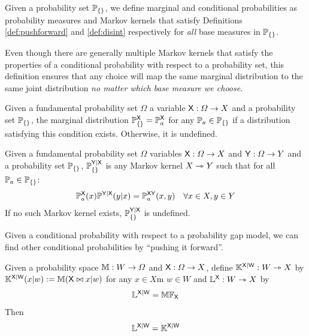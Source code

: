 Given a probability set $\mathbb{P}_{\{\}}$, we define marginal and conditional probabilities as probability measures and Markov kernels that satisfy Definitions \ref{def:pushforward} and \ref{def:disint} respectively for \emph{all} base measures in $\mathbb{P}_{\{\}}$. 

Even though there are generally multiple Markov kernels that satisfy the properties of a conditional probability with respect to a probability set, this definition ensures that any choice will map the same marginal distribution to the same joint distribution \emph{no matter which base measure we choose}.

\begin{definition}
Given a fundamental probability set $\Omega$ a variable $\mathsf{X}:\Omega\to X$ and a probability set $\mathbb{P}_{\{\}}$, the marginal distribution $\mathbb{P}_{\{\}}^{\mathsf{X}}=\mathbb{P}_a^{\mathsf{X}}$ for any $\mathbb{P}_a\in\mathbb{P}_{\{\}}$ if a distribution satisfying this condition exists. Otherwise, it is undefined.
\end{definition}

\begin{definition}
Given a fundamental probability set $\Omega$ variables $\mathsf{X}:\Omega\to X$ and $\mathsf{Y}:\Omega\to Y$ and a probability set $\mathbb{P}_{\{\}}$, $\mathbb{P}_{\{\}}^{\mathsf{Y}|\mathsf{X}}$ is any Markov kernel $X\rightarrowtriangle Y$ such that for all $\mathbb{P}_a\in \mathbb{P}_{\{\}}$:
\begin{align}
	\mathbb{P}_a^{\mathsf{X}}(x)\mathbb{P}^{\mathsf{Y}|\mathsf{X}}(y|x)&= \mathbb{P}_a^{\mathsf{XY}}(x,y) &\forall x\in X, y\in Y
\end{align}
If no such Markov kernel exists, $\mathbb{P}_{\{\}}^{\mathsf{Y}|\mathsf{X}}$ is undefined.
\end{definition}

Given a conditional probability with respect to a probability gap model, we can find other conditional probabilities by ``pushing it forward''.

\begin{lemma}\label{lem:prod_pushf}
Given a probability space $\mathbb{M}:W\to \Omega$ and $\mathsf{X}:\Omega\to X$, define $\mathbb{K}^{\mathsf{X}|\mathsf{W}}:W\rightarrowtriangle X$ by $\mathbb{K}^{\mathsf{X}|\mathsf{W}}(x|w):=\mathbb{M}(\mathsf{X}\bowtie x|w)$ for any $x\in X$m $w\in W$ and $\mathbb{L}^{\mathsf{X}}:W\rightarrowtriangle X$ by
\begin{align}
	\mathbb{L}^{\mathsf{X}|\mathsf{W}} = \mathbb{M}\mathbb{F}_{\mathsf{X}}
\end{align}
Then
\begin{align}
\mathbb{L}^{\mathsf{X}|\mathsf{W}} =\mathbb{K}^{\mathsf{X}|\mathsf{W}}
\end{align}
\end{lemma}

